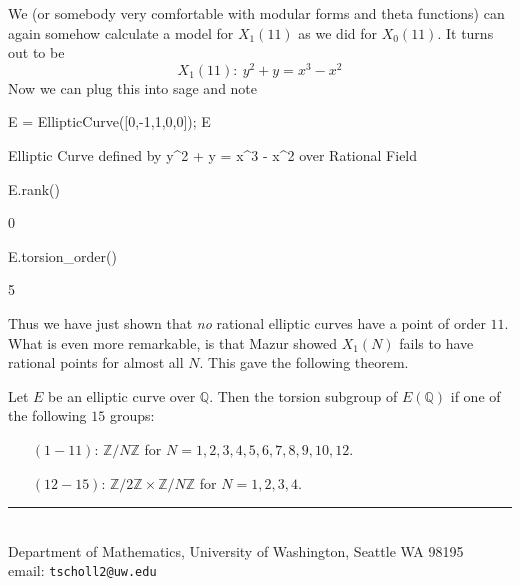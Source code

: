 \documentclass[11pt]{article}
\makeatletter
\newcommand{\BB}[1]{\mathbb{#1}} %
\newcommand{\QQ}{\BB{Q}}
\newcommand{\ZZ}{\BB{Z}}
\theoremstyle{plain}
\theoremstyle{remark}
\newcommand{\myauthor}{Travis Scholl}
\newcommand{\myemail}{tscholl2@uw.edu}
\makeatother
\begin{document}
We (or somebody very comfortable with modular forms and theta functions) can again somehow calculate a model for $X_1(11)$ as we did for $X_0(11)$. It turns out to be
$$
	X_1(11): ~ y^2 + y = x^3 - x^2
$$
Now we can plug this into sage and note
\begin{sagecode}
\begin{sagecell}
E = EllipticCurve([0,-1,1,0,0]); E
\end{sagecell}
\begin{sageout}
Elliptic Curve defined by y^2 + y = x^3 - x^2 over Rational Field
\end{sageout}
\begin{sagecell}
E.rank()
\end{sagecell}
\begin{sageout}
0
\end{sageout}
\begin{sagecell}
E.torsion_order()
\end{sagecell}
\begin{sageout}
5
\end{sageout}
\end{sagecode}

Thus we have just shown that \emph{no} rational elliptic curves have a point of order $11$. What is even more remarkable, is that Mazur showed $X_1(N)$ fails to have rational points for almost all $N$. This gave the following theorem.

\begin{thm}
	Let $E$ be an elliptic curve over $\QQ$. Then the torsion subgroup of $E(\QQ)$ if one of the following $15$ groups:
	\begin{enumerate}
		\item[$(1-11)$:] $\ZZ/N\ZZ$ for $N = 1,2,3,4,5,6,7,8,9,10,12$.
		\item[$(12-15)$:] $\ZZ/2\ZZ\times\ZZ/N\ZZ$ for $N=1,2,3,4$.
	\end{enumerate}
\end{thm}







\begin{center}
\noindent\rule{4cm}{.5pt}
\vspace{.25cm}

\noindent {\sc \small \myauthor}\\
{\small Department of Mathematics, University of Washington, Seattle WA 98195} \\
email: {\tt \myemail}
\end{center}
\end{document}
